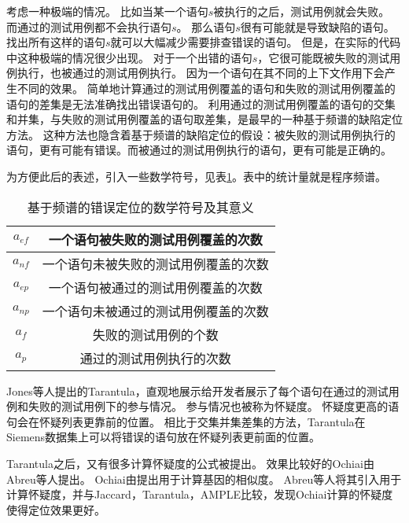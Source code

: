 考虑一种极端的情况。
比如当某一个语句$s$被执行的之后，测试用例就会失败。
而通过的测试用例都不会执行语句$s$。
那么语句$s$很有可能就是导致缺陷的语句。
找出所有这样的语句$s$就可以大幅减少需要排查错误的语句。
但是，在实际的代码中这种极端的情况很少出现。
对于一个出错的语句$s$，它很可能既被失败的测试用例执行，也被通过的测试用例执行。
因为一个语句在其不同的上下文作用下会产生不同的效果。
简单地计算通过的测试用例覆盖的语句和失败的测试用例覆盖的语句的差集是无法准确找出错误语句的。
利用通过的测试用例覆盖的语句的交集和并集，与失败的测试用例覆盖的语句取差集，是最早的一种基于频谱的缺陷定位方法\parencite{Renieres2003Fault}。
这种方法也隐含着基于频谱的缺陷定位的假设：被失败的测试用例执行的语句，更有可能有错误。而被通过的测试用例执行的语句，更有可能是正确的。

为方便此后的表述，引入一些数学符号，见表\ref{spec_symbol}。表中的统计量就是程序频谱。
\begin{table}
\centering
\begin{tabular}{|c|c|}
\hline
$a_{ef}$ & 一个语句被失败的测试用例覆盖的次数 \\
\hline
$a_{nf}$ & 一个语句未被失败的测试用例覆盖的次数 \\
\hline
$a_{ep}$ & 一个语句被通过的测试用例覆盖的次数 \\
\hline
$a_{np}$ & 一个语句未被通过的测试用例覆盖的次数 \\
\hline
$a_{f}$ & 失败的测试用例的个数 \\
\hline
$a_{p}$ & 通过的测试用例执行的次数 \\
\hline
\end{tabular}
\caption{基于频谱的错误定位的数学符号及其意义}
\label{spec_symbol}
\end{table}

Jones等人提出的Tarantula\parencite{Jones2002Visualization}，直观地展示给开发者展示了每个语句在通过的测试用例和失败的测试用例下的参与情况。
参与情况也被称为怀疑度。
怀疑度更高的语句会在怀疑列表更靠前的位置。
相比于交集并集差集的方法，Tarantula在Siemens数据集上可以将错误的语句放在怀疑列表更前面的位置\parencite{Jones2005Empirical}。

Tarantula之后，又有很多计算怀疑度的公式被提出。
效果比较好的Ochiai由Abreu等人提出\parencite{Abreu2006An}。
Ochiai由\parencite{Meyer2004Comparison}提出用于计算基因的相似度。
Abreu等人将其引入用于计算怀疑度，并与Jaccard\parencite{Chen2002Pinpoint}，Tarantula，AMPLE\parencite{Dallmeier2005Lightweight}比较，发现Ochiai计算的怀疑度使得定位效果更好\parencite{Abreu2006An,Abreu2007On}。


